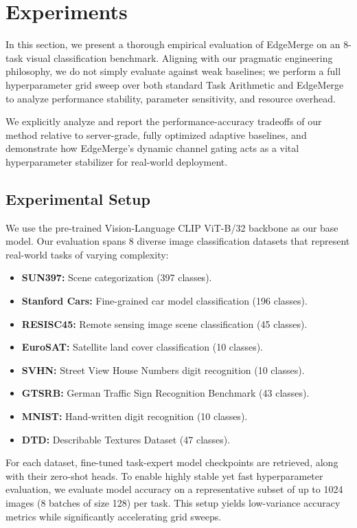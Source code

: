 \section{Experiments}
\label{sec:experiments}

In this section, we present a thorough empirical evaluation of EdgeMerge on an 8-task visual classification benchmark. Aligning with our pragmatic engineering philosophy, we do not simply evaluate against weak baselines; we perform a full hyperparameter grid sweep over both standard Task Arithmetic and EdgeMerge to analyze performance stability, parameter sensitivity, and resource overhead. 

We explicitly analyze and report the performance-accuracy tradeoffs of our method relative to server-grade, fully optimized adaptive baselines, and demonstrate how EdgeMerge's dynamic channel gating acts as a vital hyperparameter stabilizer for real-world deployment.

\subsection{Experimental Setup}
We use the pre-trained Vision-Language CLIP ViT-B/32 backbone \cite{radford2021learning} as our base model. Our evaluation spans 8 diverse image classification datasets that represent real-world tasks of varying complexity:
\begin{itemize}
    \item \textbf{SUN397:} Scene categorization (397 classes).
    \item \textbf{Stanford Cars:} Fine-grained car model classification (196 classes).
    \item \textbf{RESISC45:} Remote sensing image scene classification (45 classes).
    \item \textbf{EuroSAT:} Satellite land cover classification (10 classes).
    \item \textbf{SVHN:} Street View House Numbers digit recognition (10 classes).
    \item \textbf{GTSRB:} German Traffic Sign Recognition Benchmark (43 classes).
    \item \textbf{MNIST:} Hand-written digit recognition (10 classes).
    \item \textbf{DTD:} Describable Textures Dataset (47 classes).
\end{itemize}

For each dataset, fine-tuned task-expert model checkpoints are retrieved, along with their zero-shot heads. To enable highly stable yet fast hyperparameter evaluation, we evaluate model accuracy on a representative subset of up to 1024 images (8 batches of size 128) per task. This setup yields low-variance accuracy metrics while significantly accelerating grid sweeps.

